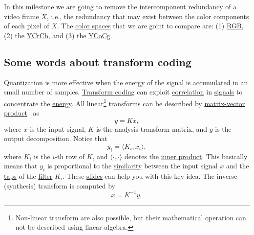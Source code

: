 In this milestone we are going to remove the intercomponent redundancy
of a video frame $X$, i.e., the redundancy that may exist between the
color components of each pixel of $X$. The
\href{https://en.wikipedia.org/wiki/Color_space}{color spaces} that we
are goint to compare are: (1)
\href{https://en.wikipedia.org/wiki/RGB_color_model}{RGB}, (2) the
\href{https://en.wikipedia.org/wiki/YCbCr}{YCrCb}, and (3) the
\href{https://en.wikipedia.org/wiki/YCoCg}{YCoCg}.

\subsection{Some words about transform coding}
Quantization is more effective when the energy of the signal is
accumulated in an small number of samples.
\href{https://web.stanford.edu/class/ee398a/handouts/lectures/07-TransformCoding.pdf}{Transform
  coding} can exploit
\href{https://en.wikipedia.org/wiki/Correlation_and_dependence}{correlation}
in \href{https://en.wikipedia.org/wiki/Signal}{signals} to concentrate
the
\href{https://en.wikipedia.org/wiki/Energy_(signal_processing)}{energy}. 
All linear\footnote{Non-linear transform are also possible, but their
  mathematical operation can not be described using linear algebra.}
transforms can be described by
\href{https://en.wikipedia.org/wiki/Matrix_multiplication}{matrix-vector
  product}~\cite{strang4linear} as
\begin{equation}
  y = Kx,
  \label{eq:forward_transform_matrix_form}
\end{equation}
where $x$ is the input signal, $K$ is the analysis transform matrix,
and $y$ is the output decomposition. Notice that
\begin{equation}
  y_i = \langle K_i, x_i\rangle,
\end{equation}
where $K_i$ is the $i$-th row of $K$, and $\langle\cdot,\cdot\rangle$
denotes the
\href{https://mathworld.wolfram.com/InnerProduct.html}{inner
  product}. This basically means that $y_i$ is proportional to the
\href{https://en.wikipedia.org/wiki/Similarity_(geometry)}{similarity}
between the input signal $x$ and the
\href{https://en.wikipedia.org/wiki/Finite_impulse_response}{taps} of
the \href{https://en.wikipedia.org/wiki/Digital_filter}{filter}
$K_i$. These
\href{https://cseweb.ucsd.edu/classes/fa17/cse166-a/lec13.pdf}{slides}
can help you with this key idea. The inverse (synthesis) transform is
computed by
\begin{equation}
  x = K^{-1}y,
  \label{eq:backward_transform_matrix_form}
\end{equation}
